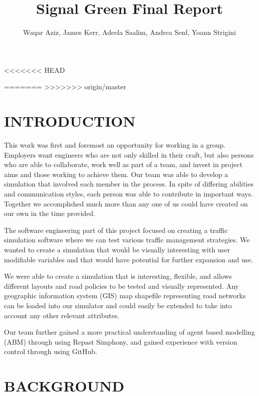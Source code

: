 \documentclass[11pt]{article}
\begin{document}
\title{Signal Green Final Report}

\author{Waqar Aziz, James Kerr, Adeela Saalim, Andrea Senf, Yoann Strigini}

\maketitle 

<<<<<<< HEAD
\listoftables
\tableofcontents
{}


=======
>>>>>>> origin/master

\section{INTRODUCTION}


This work was first and foremost an opportunity for working in a group. Employers want engineers who are not only skilled in their craft, but also persons who are able to collaborate, work well as part of a team, and invest in project aims and those working to achieve them. Our team was able to develop a simulation that involved each member in the process. In spite of differing abilities and communication styles, each person was able to contribute in important ways. Together we accomplished much more than any one of us could have created on our own in the time provided.

The software engineering part of this project focused on creating a traffic simulation software where we can test various traffic management strategies. We wanted to create a simulation that would be visually interesting with user modifiable variables and that would have potential for further expansion and use.

We were able to create a simulation that is interesting, flexible, and allows different layouts and road policies to be tested and visually represented. Any geographic information system (GIS) map shapefile representing road networks can be loaded into our simulator and could easily be extended to take into account any other relevant attributes.

Our team further gained a more practical understanding of agent based modelling (ABM) through using Repast Simphony, and gained experience with version control through using GitHub.



\section{BACKGROUND}
\end{document}
